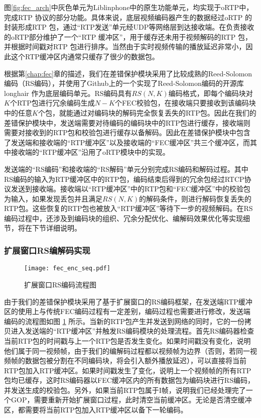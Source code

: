     图\ref{fig:fec_arch}中灰色单元为Liblinphone中的原生功能单元，均实现于oRTP中，完成RTP 协议的部分功能。具体来说，底层视频编码器产生的数据经过oRTP 的封装形成RTP 包，通过``RTP发送''单元经UDP等网络层到达接收端。在负责接收的oRTP部分维护了一个``RTP 缓冲区''，用于缓存还未用于视频解码的RTP 包，并根据时间戳对RTP 包进行排序。当然由于实时视频传输的播放延迟非常小，因此这个RTP缓冲区内通常只缓存了很少的数据包。

    根据第\ref{chap:fec}章的描述，我们在差错保护模块采用了比较成熟的Reed-Solomon编码（RS编码），并使用了Github上的一个实现了Reed-Solomon编码的开源库longhair\cite{website:longhair} 作为底层编码单元。RS编码具有$RS(N,K)$编码格式，即每个编码块对$K$个RTP包进行冗余编码生成$N-K$个FEC校验包，在接收端只要接收到该编码块中的任意$K$个包，就能通过对编码块的解码完全恢复丢失的RTP包。因此在我们的差错保护模块中，发送端需要对待编码的编码块中的RTP包进行缓存，接收端则需要对接收到的RTP包和校验包进行缓存以备解码。因此在差错保护模块中包含了发送端和接收端的``RTP缓冲区''以及接收端的``FEC缓冲区''共三个缓冲区，而其中接收端的``RTP缓冲区''沿用了oRTP模块中的实现。

    发送端的``RS编码''和接收端的``RS解码''单元分别完成RS编码和解码过程。其中RS编码的输入为RTP缓冲区中的RTP包，编码结束后得到的冗余包经过RTCP协议发送到接收端。接收端以``RTP缓冲区''中的RTP包和``FEC缓冲区''中的校验包为输入，如果发现丢包并且满足$RS(N,K)$的解码条件，则进行解码恢复丢失的RTP包。这些恢复的RTP包也被放入``RTP缓冲区''等待下一步的视频解码。在RS编码过程中，还涉及到编码块的组织、冗余分配优化、编解码效果优化等实现细节，将在下节详细说明。

    \subsubsection{扩展窗口RS编解码实现}
    \begin{figure}[htbp]
      \centering
      \texttt{[image: fec\_enc\_seq.pdf]}
      \caption{扩展窗口RS编码流程图}
      \label{fig:fec_enc_seq}
    \end{figure}

    由于我们的差错保护模块采用了基于扩展窗口的RS编码框架，在发送端RTP缓冲区的使用上与传统FEC编码过程有一定差别，编码过程也需要进行修改，发送端编码的流程图如图 \ref{fig:fec_enc_seq} 所示。当新的RTP包产生并发送到网络的同时，它的一份拷贝进入发送端的``RTP缓冲区''并触发RS编码模块的处理流程。首先RS编码器检查当前RTP包的时间戳与上一个RTP包是否发生变化。如果时间戳没有变化，说明他们属于同一视频帧，由于我们的编解码过程都以视频帧为边界（否则，若同一视频帧的数据包被分割在不同编码块，将会引入额外播放延迟），可以直接将当前RTP包加入RTP缓冲区。如果时间戳发生了变化，说明上一个视频帧的所有RTP包均已缓存，这时RS编码器以FEC缓冲区内的所有数据包为编码块进行RS编码，并发送生成的校验包。另外，如果当前RTP包属于I帧，说明我们已经处理完了一个GOP，需要重新开始扩展窗口过程，此时清空当前缓冲区。无论是否清空缓冲区，都需要将当前RTP包加入RTP缓冲区以备下一轮编码。

